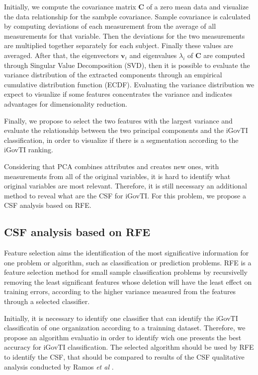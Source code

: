 Initially, we compute the covariance matrix $\mathbf{C}$ of a zero mean data and visualize the data relationship for the sambple covariance. Sample covariance is calculated by computing deviations of each measurement from the average of all measurements for that variable. Then the deviations for the two measurements are multiplied together separately for each subject. Finally these values are averaged. After that, the eigenvectors $\mathbf{v}_i$ and eigenvalues $\lambda_i$ of $\mathbf{C}$ are computed through Singular Value Decomposition (SVD), then it is possible to evaluate the variance distribution of the extracted components through an empirical cumulative distribution function (ECDF). Evaluating the variance distribution we expect to visualize if some features concentrates the variance and indicates advantages for dimensionality reduction.

Finally, we propose to select the two features with the largest variance and evaluate the relationship between the two principal components and the iGovTI classification, in order to visualize if there is a segmentation according to the iGovTI ranking.

Considering that PCA combines attributes and creates new ones, with measurements from all of the original variables, it is hard to identify what original variables are most relevant. Therefore, it is still necessary an additional method to reveal what are the CSF for iGovTI. For this problem, we propose a CSF analysis based on RFE.

\subsection{CSF analysis based on RFE}
\label{sec:ch2_csfa}

Feature selection aims the identification of the most significative information for one problem or algorithm, such as classification or prediction problems. RFE is a feature selection method for small sample classification problems by recursivelly removing the least significant features whose deletion will have the least effect on training errors, according to the higher variance measured from the features through a selected classifier. 

Initially, it is necessary to identify one classifier that can identify the iGovTI classificatin of one organization according to a trainning dataset. Therefore, we propose an algorithm evaluatio in order to identify wich one presents the best accuracy for iGovTI classification. The selected algorithm should be used by RFE to identify the CSF, that should be compared to results of the CSF qualitative analysis conducted by Ramos \emph{et al} \cite{ramos2016information}.

